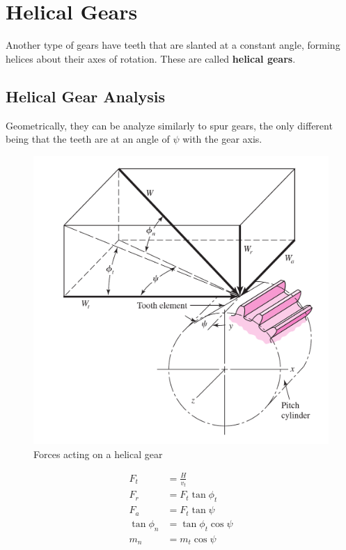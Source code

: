 \documentclass[a4paper,openany,svgnames]{kaobook}
\begin{document}
\chapter{Helical Gears}
\label{sec:orgfac8cc0}

Another type of gears have teeth that are slanted at a constant angle, forming helices about their axes of rotation. These are called \textbf{helical gears}.


\section{Helical Gear Analysis}
\label{sec:orgb6e37a3}

Geometrically, they can be analyze similarly to spur gears, the only different being that the teeth are at an angle of \(\psi\) with the gear axis.

\begin{figure}[htbp]
\centering
\includegraphics[width=.9\linewidth]{./pictures/Gears/helical-gear-forces.png}
\caption{\label{fig: helical gear forces}Forces acting on a helical gear}
\end{figure}

\begin{align}
  F_{t} &= \frac{H}{v_{t}} \\
  F_{r} &= F_{t} \tan \phi_{t} \\
  F_{a} &= F_{t} \tan \psi \\
  \tan \phi_{n} &= \tan \phi_{t} \cos \psi \\
  m_{n} &= m_{t} \cos \psi
\end{align}
\end{document}
